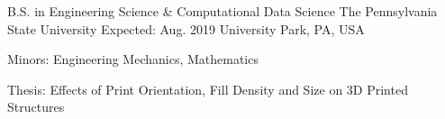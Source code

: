 
\begin{cventries}

	\cventry
	{B.S. in Engineering Science \& Computational Data Science} %
	{The Pennsylvania State University} %
	{Expected: Aug. 2019} %
	{University Park, PA, USA} %
	{
		\begin{cvitems} %
			\item {Minors: Engineering Mechanics, Mathematics}
			\item {Thesis: Effects of Print Orientation, Fill Density and Size on 3D Printed Structures}
		\end{cvitems}
	}
	
\end{cventries}